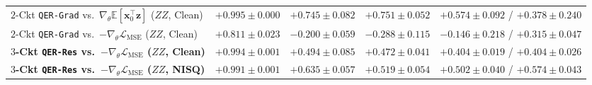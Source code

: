 \documentclass[11pt]{article}
\begin{document}
\begin{table}[t!]
{\begin{tabular}{@{}lcccc@{}}
\midrule
$2$-Ckt \texttt{QER-Grad} vs.\ $\nabla_\theta\mathbb{E}[\mathbf{x}_0^\top\mathbf{z}]$ ($ZZ$, Clean) & $+0.995 \pm 0.000$ & $+0.745 \pm 0.082$ & $+0.751 \pm 0.052$ & $+0.574 \pm 0.092$ / $+0.378 \pm 0.240$ \\
$2$-Ckt \texttt{QER-Grad} vs.\ $-\nabla_\theta\mathcal{L}_{\text{MSE}}$ ($ZZ$, Clean) & $+0.811 \pm 0.023$ & $-0.200 \pm 0.059$ & $-0.288 \pm 0.115$ & $-0.146 \pm 0.218$ / $+0.315 \pm 0.047$ \\
\textbf{$3$-Ckt \texttt{QER-Res} vs.\ $-\nabla_\theta\mathcal{L}_{\text{MSE}}$ ($ZZ$, Clean)} & $\mathbf{+0.994 \pm 0.001}$ & $\mathbf{+0.494 \pm 0.085}$ & $\mathbf{+0.472 \pm 0.041}$ & $\mathbf{+0.404 \pm 0.019}$ / $\mathbf{+0.404 \pm 0.026}$ \\
\textbf{$3$-Ckt \texttt{QER-Res} vs.\ $-\nabla_\theta\mathcal{L}_{\text{MSE}}$ ($ZZ$, NISQ)} & $\mathbf{+0.991 \pm 0.001}$ & $\mathbf{+0.635 \pm 0.057}$ & $\mathbf{+0.519 \pm 0.054}$ & $\mathbf{+0.502 \pm 0.040}$ / $\mathbf{+0.574 \pm 0.043}$ \\
\bottomrule
\end{tabular}%
}
\end{table}
\end{document}
